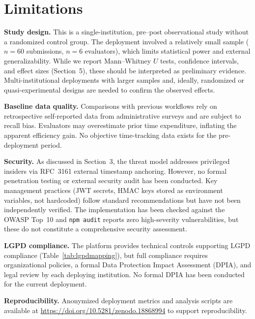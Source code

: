 \documentclass[preprint,12pt,a4paper]{elsarticle}
\begin{document}
\section{Limitations}

\textbf{Study design.} This is a single-institution, pre--post observational study without a randomized control group. The deployment involved a relatively small sample ($n = 60$ submissions, $n = 6$ evaluators), which limits statistical power and external generalizability. While we report Mann--Whitney $U$ tests, confidence intervals, and effect sizes (Section~5), these should be interpreted as preliminary evidence. Multi-institutional deployments with larger samples and, ideally, randomized or quasi-experimental designs are needed to confirm the observed effects.

\textbf{Baseline data quality.} Comparisons with previous workflows rely on retrospective self-reported data from administrative surveys and are subject to recall bias. Evaluators may overestimate prior time expenditure, inflating the apparent efficiency gain. No objective time-tracking data exists for the pre-deployment period.

\textbf{Security.} As discussed in Section~3, the threat model addresses privileged insiders via RFC~3161 external timestamp anchoring. However, no formal penetration testing or external security audit has been conducted. Key management practices (JWT secrets, HMAC keys stored as environment variables, not hardcoded) follow standard recommendations but have not been independently verified. The implementation has been checked against the OWASP Top~10 \citep{Owasp2023} and \texttt{npm audit} reports zero high-severity vulnerabilities, but these do not constitute a comprehensive security assessment.

\textbf{LGPD compliance.} The platform provides technical controls supporting LGPD compliance (Table~\ref{tab:lgpdmapping}), but full compliance requires organizational policies, a formal Data Protection Impact Assessment (DPIA), and legal review by each deploying institution. No formal DPIA has been conducted for the current deployment.

\textbf{Reproducibility.} Anonymized deployment metrics and analysis scripts are available at \url{https://doi.org/10.5281/zenodo.18868994} to support reproducibility.

\end{document}
